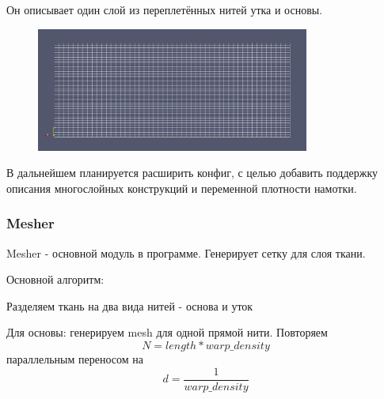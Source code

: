 Он описывает один слой из переплетённых нитей утка и основы.

\begin{figure}[H]
    \includegraphics[width=0.8\textwidth]{img/scheme.png}
    \centering
\end{figure}

В дальнейшем планируется расширить конфиг, с целью добавить поддержку описания многослойных конструкций
и переменной плотности намотки.

\subsubsection*{Mesher}
Mesher - основной модуль в программе.
Генерирует сетку для слоя ткани.

Основной алгоритм:

Разделяем ткань на два вида нитей - основа и уток

Для основы: генерируем mesh для одной прямой нити.
Повторяем
\[
    N = length * warp\_density
\]
параллельным переносом на
\[
    d = \frac{1}{warp\_density}
\]



